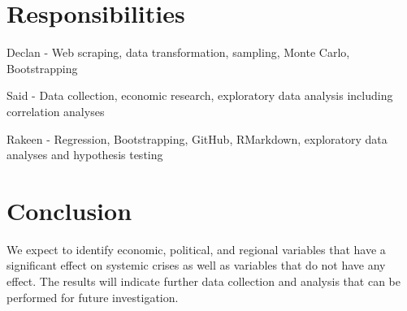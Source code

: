 \documentclass[
]{article}
\begin{document}
\hypertarget{responsibilities}{%
\section{Responsibilities}\label{responsibilities}}

Declan - Web scraping, data transformation, sampling, Monte Carlo,
Bootstrapping

Said - Data collection, economic research, exploratory data analysis
including correlation analyses

Rakeen - Regression, Bootstrapping, GitHub, RMarkdown, exploratory data
analyses and hypothesis testing

\hypertarget{conclusion}{%
\section{Conclusion}\label{conclusion}}

We expect to identify economic, political, and regional variables that
have a significant effect on systemic crises as well as variables that
do not have any effect. The results will indicate further data
collection and analysis that can be performed for future investigation.
\end{document}
